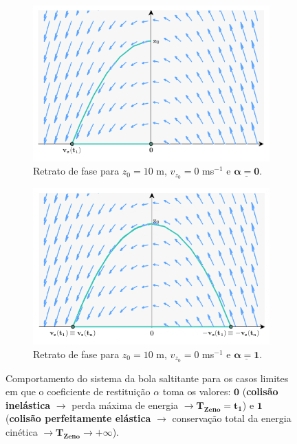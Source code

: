 \vspace{-1.25em}
\begin{figure}[ht] 
    \begin{subfigure}[b]{0.5\linewidth}
        \centering
        \includegraphics[width=1\linewidth]{img/P1/P1-PhasePortrait-alpha=0.png}
        \caption{Retrato de fase para $z_0 = 10$ m, $v_{z_0} = 0$ ms$^{-1}$ e $\pmb{\underline{\alpha = 0}}$.} 
        \label{fig:phase-portrait-alpha0} 
    \end{subfigure}%
    \begin{subfigure}[b]{0.5\linewidth}
        \centering
        \includegraphics[width=1\linewidth]{img/P1/P1-PhasePortrait-alpha=1.png} 
        \caption{Retrato de fase para $z_0 = 10$ m, $v_{z_0} = 0$ ms$^{-1}$ e $\pmb{\underline{\alpha = 1}}$.} 
        \label{fig:phase-portrait-alpha1} 
    \end{subfigure} 
    \caption{Comportamento do sistema da bola saltitante para os casos limites em que o coeficiente de restituição $\alpha$ toma os valores: $\pmb{0}$ (\textbf{colisão inelástica} $\rightarrow$ perda máxima de energia $\rightarrow \pmb{T_{Zeno} = t_1}$) e $\pmb{1}$ (\textbf{colisão perfeitamente elástica} $\rightarrow$ conservação total da energia cinética $\rightarrow \pmb{T_{Zeno} \to +\infty}$).}
    \label{fig:phase-portrait-limites}
\end{figure}

